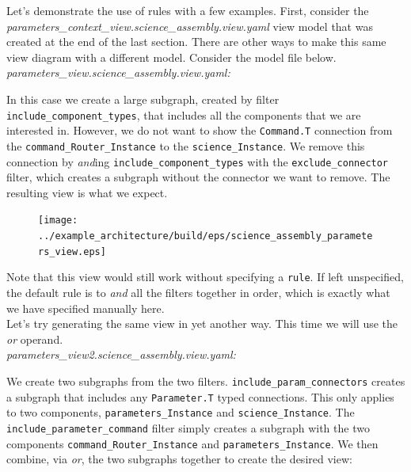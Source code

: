 Let's demonstrate the use of rules with a few examples. First, consider the \textit{parameters\_context\_view.science\_assembly.view.yaml} view model that was created at the end of the last section. There are other ways to make this same view diagram with a different model. Consider the model file below. \\

\textit{parameters\_view.science\_assembly.view.yaml:}

In this case we create a large subgraph, created by filter \texttt{include\_component\_types}, that includes all the components that we are interested in. However, we do not want to show the \texttt{Command.T} connection from the \texttt{command\_Router\_Instance} to the \texttt{science\_Instance}. We remove this connection by \textit{and}ing \texttt{include\_component\_types} with the \texttt{exclude\_connector} filter, which creates a subgraph without the connector we want to remove. The resulting view is what we expect.

\begin{figure}[H]
  \texttt{[image: ../example\_architecture/build/eps/science\_assembly\_parameters\_view.eps]}
\end{figure}

Note that this view would still work without specifying a \texttt{rule}. If left unspecified, the default rule is to \textit{and} all the filters together in order, which is exactly what we have specified manually here. \\

Let's try generating the same view in yet another way. This time we will use the \textit{or} operand. \\

\textit{parameters\_view2.science\_assembly.view.yaml:}

We create two subgraphs from the two filters. \texttt{include\_param\_connectors} creates a subgraph that includes any \texttt{Parameter.T} typed connections. This only applies to two components, \texttt{parameters\_Instance} and \texttt{science\_Instance}. The \texttt{include\_parameter\_command} filter simply creates a subgraph with the two components \texttt{command\_Router\_Instance} and \texttt{parameters\_Instance}. We then combine, via \textit{or}, the two subgraphs together to create the desired view:

